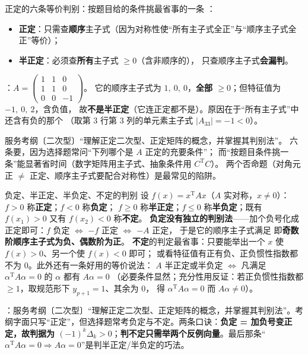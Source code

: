 \begin{fdeep}{正定的六条等价判别：按题目给的条件挑最省事的一条}
：
\begin{itemize}[leftmargin=2.2em,itemsep=0.22em]
\item \textbf{正定}：只需查\textbf{顺序}主子式（因为对称性使“所有主子式全正”与“顺序主子式全正”等价）；
\item \textbf{半正定}：必须查\textbf{所有}主子式 $\ge0$（含非顺序的），
      只查顺序主子式\textbf{会漏判}。
\end{itemize}
：$A=\begin{pmatrix}1&1&0\\1&1&0\\0&0&-1\end{pmatrix}$。
它的顺序主子式为 $1,\ 0,\ 0$，\textbf{全部 $\ge0$}；但特征值为 $-1,\ 0,\ 2$，含负值，
故\textbf{不是半正定}（它连正定都不是）。原因在于“所有主子式”中还含有负的那个
（取第 3 行第 3 列的单元素主子式 $\lvert A_{33}\rvert=-1<0$）。

\fbref{}服务考纲〔二次型〕“理解正定二次型、正定矩阵的概念，并掌握其判别法”。
六条要，因为选择题常问“下列哪个是 $A$ 正定的充要条件”；
而“按题目条件挑一条”能显著省时间（数字矩阵用主子式、抽象条件用 $C^{\mathrm T}C$）。
两个否命题（对角元正 $\ne$ 正定、顺序主子式要配合对称性）是最常见的陷阱。
\end{fdeep}

\begin{fdeep}{负定、半正定、半负定、不定的判别}
设 $f(x)=x^{\mathrm T}Ax$（$A$ 实对称，$x\ne0$）：$f>0$ 称\textbf{正定}；$f<0$ 称\textbf{负定}；
$f\ge0$ 称\textbf{半正定}；$f\le0$ 称\textbf{半负定}；既有 $f(x_1)>0$ 又有 $f(x_2)<0$ 称\textbf{不定}。
\textbf{负定没有独立的判别法}——加个负号化成正定即可：$f$ 负定 $\iff$ $-f$ 正定 $\iff$ $-A$ 正定，
于是它的顺序主子式满足
即\textbf{奇数阶顺序主子式为负、偶数阶为正}。
\textbf{不定}的判定最省事：只要能举出一个 $x$ 使 $f(x)>0$、另一个使 $f(x)<0$ 即可；
或看特征值有正有负、正负惯性指数都不为 $0$。此外还有一条好用的等价说法：
$A$ 半正定或半负定 $\iff$ 凡满足 $\alpha^{\mathrm T}A\alpha=0$ 的 $\alpha$ 都有 $A\alpha=0$
（必要条件显然；充分性用反证：若正负惯性指数都 $\ge1$，取规范形下 $y_{p+1}=1$、其余为 $0$，
得 $\alpha^{\mathrm T}A\alpha=0$ 而 $A\alpha\ne0$）。

\fbref{}：服务考纲〔二次型〕“理解正定二次型、正定矩阵的概念，并掌握其判别法”。考纲字面只写“正定”，但选择题常考负定与不定。两条口诀：\textbf{负定 = 加负号变正定，故判据为 $(-1)^{k}\Delta_k>0$}；\textbf{判不定只需举两个反例向量}。最后那条“$\alpha^{\mathrm T}A\alpha=0\Longrightarrow A\alpha=0$”是判半正定/半负定的巧法。
\end{fdeep}

